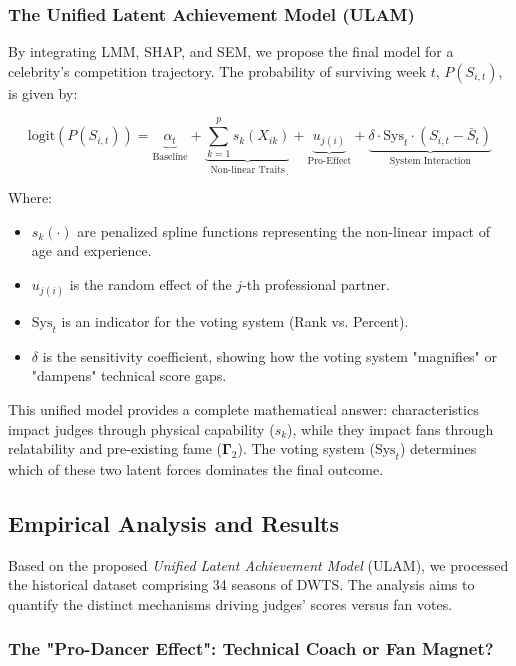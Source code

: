 \documentclass[12pt]{article}
\begin{document}
\subsubsection{The Unified Latent Achievement Model (ULAM)}

By integrating LMM, SHAP, and SEM, we propose the final model for a celebrity's competition trajectory. The probability of surviving week $t$, $P(S_{i,t})$, is given by:

\begin{equation}
    \text{logit}(P(S_{i,t})) = \underbrace{\alpha_t}_{\text{Baseline}} + \underbrace{\sum_{k=1}^p s_k(X_{ik})}_{\text{Non-linear Traits}} + \underbrace{u_{j(i)}}_{\text{Pro-Effect}} + \underbrace{\delta \cdot \text{Sys}_t \cdot (S_{i,t} - \bar{S}_t)}_{\text{System Interaction}}
\end{equation}

Where:
\begin{itemize}
    \item $s_k(\cdot)$ are penalized spline functions representing the non-linear impact of age and experience.
    \item $u_{j(i)}$ is the random effect of the $j$-th professional partner.
    \item $\text{Sys}_t$ is an indicator for the voting system (Rank vs. Percent).
    \item $\delta$ is the sensitivity coefficient, showing how the voting system "magnifies" or "dampens" technical score gaps.
\end{itemize}

This unified model provides a complete mathematical answer: characteristics impact judges through physical capability ($s_k$), while they impact fans through relatability and pre-existing fame ($\bm{\Gamma}_2$). The voting system ($\text{Sys}_t$) determines which of these two latent forces dominates the final outcome.

\subsection{Empirical Analysis and Results}

Based on the proposed \textit{Unified Latent Achievement Model} (ULAM), we processed the historical dataset comprising 34 seasons of DWTS. The analysis aims to quantify the distinct mechanisms driving judges' scores versus fan votes.

\subsubsection{The "Pro-Dancer Effect": Technical Coach or Fan Magnet?}
\end{document}
